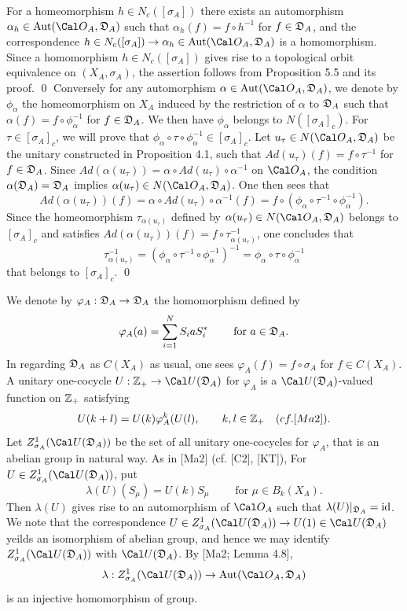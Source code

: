 For a homeomorphism $h \in N_c([\sigma_A])$
there exists an automorphism
$\alpha_h \in \Aut(\OA,\DA)$ such that 
$\alpha_h(f) = f \circ h^{-1}$
for
$f \in {{\frak D}_A}$, and
the correspondence
$h \in N_c([\sigma_A]) 
\rightarrow \alpha_h \in \Aut(\OA,\DA)$
is a homomorphism.
\endproclaim
{}
Since a homomorphism
$h \in N_c([\sigma_A])$ gives rise to a topological 
orbit equivalence on $(X_A,\sigma_A)$,
the assertion follows from Proposition 5.5 and its proof.
\qed
\enddemo
Conversely
for any automorphism
$\alpha \in \Aut(\OA,\DA)$, we denote by
$\phi_\alpha$ the homeomorphism on $X_A$ induced by the restriction
of $\alpha$ to ${{\frak D}_A}$ such that
$\alpha(f) = f \circ \phi_\alpha^{-1}$ for $f \in {{\frak D}_A}$. 
We then have
$\phi_\alpha$ belongs to $N([\sigma_A]_c)$. 
\endproclaim
{}
For $\tau \in [\sigma_A]_c$, 
we will prove that
$\phi_\alpha\circ \tau \circ \phi_\alpha^{-1} \in [\sigma_A]_c.$
Let $u_\tau \in N(\OA,\DA)$ be the unitary constructed in Proposition 4.1,
such that 
$Ad(u_\tau)(f) = f \circ \tau^{-1}$ for $f \in {{\frak D}_A}$.
Since
$
Ad(\alpha(u_\tau))
=\alpha \circ Ad(u_\tau) \circ \alpha^{-1}
$
on $\OA$,
the condition
$\alpha({{\frak D}_A}) = {{\frak D}_A}$
implies
$\alpha(u_\tau)\in N(\OA,\DA)$.
One then sees that
$$
Ad(\alpha(u_\tau))(f) 
=\alpha \circ Ad(u_\tau) \circ \alpha^{-1}(f)
=f \circ (\phi_\alpha \circ \tau^{-1} \circ \phi_\alpha^{-1}).
$$
Since the homeomorphism
$\tau_{\alpha(u_\tau)}$ defined by $\alpha(u_\tau)\in N(\OA,\DA)$
belongs to
$[\sigma_A]_c$ 
and satisfies 
$
Ad(\alpha(u_\tau))(f) 
= f \circ \tau_{\alpha(u_\tau)}^{-1}$,
one concludes that
$$
\tau_{\alpha(u_\tau)}^{-1} 
= (\phi_\alpha \circ \tau^{-1} \circ \phi_\alpha^{-1})^{-1}
= \phi_\alpha \circ \tau \circ \phi_\alpha^{-1}
$$
that belongs to
$[\sigma_A]_c$.
\qed
\enddemo

We denote by $\varphi_A:{{\frak D}_A} \rightarrow {{\frak D}_A}$ the homomorphism
defined by 
$$
\varphi_A(a) = \sum_{i=1}^N S_i a S_i^* \qquad
\text{ for } a \in {{\frak D}_A}.
$$
In regarding ${{\frak D}_A}$ as $C(X_A)$ as usual,
one sees
$\varphi_A(f) = f\circ \sigma_A$ for $f \in C(X_A)$.
A unitary one-cocycle 
$U:\Zp \rightarrow {\Cal U}(\DA)$
for $\varphi_A$
is a ${\Cal U}(\DA)$-valued 
 function on ${ {\Bbb Z}_+ }$ satisfying
$$
U(k+l) = U(k) \varphi_A^k(U(l), \qquad k,l\in { {\Bbb Z}_+ } \quad (cf. [Ma2]).
$$
Let
$Z_{\sigma_A}^1({\Cal U}(\DA))$
be the set of all unitary one-cocycles for $\varphi_A$,
that is an abelian group in natural way.
As in [Ma2] (cf. [C2], [KT]),
For $U \in Z_{\sigma_A}^1({\Cal U}(\DA))$,
put
$$
\lambda(U)(S_\mu) = U(k) S_\mu
\qquad \text{ for } \mu \in B_k(X_A).
$$
Then  
$
\lambda(U)
$
gives rise to an automorphism of $\OA$
such that $\lambda(U)|_{{{\frak D}_A}} = {{\operatorname{id}}}$.
We note that the correspondence
$U \in Z_{\sigma_A}^1({\Cal U}(\DA)) \rightarrow U(1) \in {\Cal U}(\DA)$
yeilds an isomorphism of abelian group, and hence we may identify
$Z_{\sigma_A}^1({\Cal U}(\DA))$ with ${\Cal U}(\DA)$.
By [Ma2; Lemma 4.8],
$$
\lambda:Z_{\sigma_A}^1({\Cal U}(\DA)) \rightarrow \Aut(\OA, \DA)
$$
is an injective homomorphism of group.


